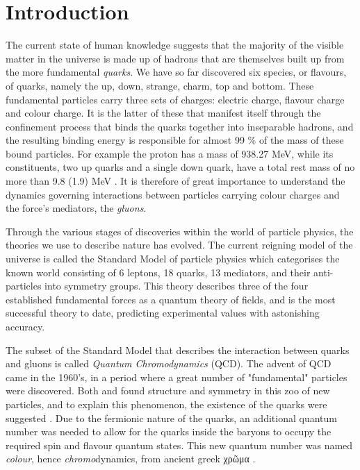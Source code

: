\chapter{Introduction}

The current state of human knowledge suggests that the majority of the visible
matter in the universe is made up of hadrons that are themselves built up from
the more fundamental \emph{quarks}. We have so far discovered six species, or
flavours, of quarks, namely the up, down, strange, charm, top and bottom. These
fundamental particles carry three sets of charges: electric charge, flavour
charge and colour charge.  It is the latter of these that manifest itself
through the confinement process that binds the quarks together into inseparable
hadrons, and the resulting binding energy is responsible for almost 99 \% of the
mass of these bound particles. For example the proton has a mass of 938.27 MeV,
while its constituents, two up quarks and a single down quark, have a total rest
mass of no more than 9.8 (1.9) MeV \citep{Agashe:2014kda}. It is therefore of
great importance to understand the dynamics governing interactions between
particles carrying colour charges and the force's mediators, the \emph{gluons}. 

Through the various stages of discoveries within the world of particle physics,
the theories we use to describe nature has evolved. The current reigning model
of the universe is called the Standard Model of particle physics which
categorises the known world consisting of 6 leptons, 18 quarks, 13 mediators,
and their anti-particles into symmetry groups. This theory describes three of
the four established fundamental forces as a quantum theory of fields, and is
the most successful theory to date, predicting experimental values with
astonishing accuracy.

The subset of the Standard Model that describes the interaction between quarks
and gluons is called \emph{Quantum Chromodynamics} (QCD). The advent of QCD came
in the 1960's, in a period where a great number of "fundamental" particles were 
discovered. Both \cite{GellMann:1962xb} and \cite{Ne'eman:1961cd} found
structure and symmetry in this zoo of new particles, and to explain this
phenomenon, the existence of the quarks were suggested \citep{GellMann:1964nj}.
Due to the fermionic nature of the quarks, an additional quantum number was
needed to allow for the quarks inside the baryons to occupy the required spin
and flavour quantum states. This new quantum number was named \emph{colour},
hence \emph{chromo}dynamics, from ancient greek χρῶμα \citep{Greenberg:1964pe}.

